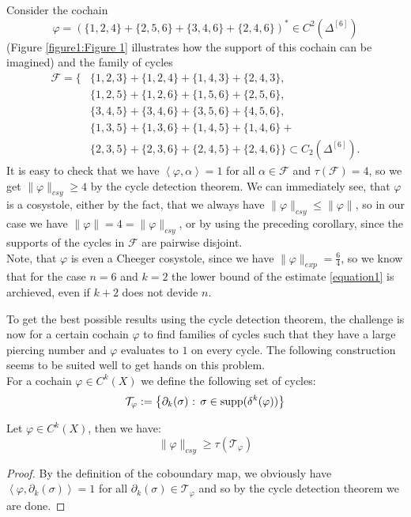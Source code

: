 \begin{expl}\label{example1a}
Consider the cochain
\[
\varphi=\left(\{1,2,4\}+\{2,5,6\}+\{3,4,6\}+\{2,4,6\}\right)^*\in C^2(\Delta^{[6]})
\]
(Figure \ref{figure1:Figure 1} illustrates how the support of this cochain can be imagined) and the family of cycles
\begin{align*}
\mathcal{F}=\{&\{1,2,3\}+\{1,2,4\}+\{1,4,3\}+\{2,4,3\},\\
&\{1,2,5\}+\{1,2,6\}+\{1,5,6\}+\{2,5,6\},\\
&\{3,4,5\}+\{3,4,6\}+\{3,5,6\}+\{4,5,6\},\\
&\{1,3,5\}+\{1,3,6\}+\{1,4,5\}+\{1,4,6\}+\\
&\{2,3,5\}+\{2,3,6\}+\{2,4,5\}+\{2,4,6\}\}\subset C_2(\Delta^{[6]}).
\end{align*}
It is easy to check that we have \(\left\langle\varphi,\alpha\right\rangle=1\) for all \(\alpha\in\mathcal{F}\) and \(\tau(\mathcal{F})=4\), so we get \(\|\varphi\|_{csy}\geq 4\) by the cycle detection theorem. We can immediately see, that \(\varphi\) is a cosystole, either by the fact, that we always have \(\|\varphi\|_{csy}\leq \|\varphi\|\), so in our case we have \(\|\varphi\|=4=\|\varphi\|_{csy}\), or by using the preceding corollary, since the supports of the cycles in \(\mathcal{F}\) are pairwise disjoint.\\
Note, that \(\varphi\) is even a Cheeger cosystole, since we have \(\|\varphi\|_{exp}=\frac{6}{4}\), so we know that for the case \(n=6\) and \(k=2\) the lower bound of the estimate \ref{equation1} is archieved, even if \(k+2\) does not devide \(n\).
\end{expl}



To get the best possible results using the cycle detection theorem, the challenge is now for a certain cochain \(\varphi\) to find families of cycles such that they have a large piercing number and \(\varphi\) evaluates to \(1\) on every cycle. The following construction seems to be suited well to get hands on this problem.\\
For a cochain \(\varphi\in C^k(X)\) we define the following set of cycles:
\[
\mathcal{T}_{\varphi}:=\left\{\partial_k(\sigma)\text{ : }\sigma\in \mathrm{supp}(\delta^k(\varphi))\right\}
\]

\begin{prop}
Let \(\varphi\in C^k(X)\), then we have:
\[
\|\varphi\|_{csy}\geq\tau(\mathcal{T}_{\varphi})
\]
\begin{proof}
By the definition of the coboundary map, we obviously have\\
\(\left\langle\varphi,\partial_k(\sigma)\right\rangle=1\) for all \(\partial_k(\sigma)\in\mathcal{T}_{\varphi}\) and so by the cycle detection theorem we are done.
\end{proof}
\end{prop}

